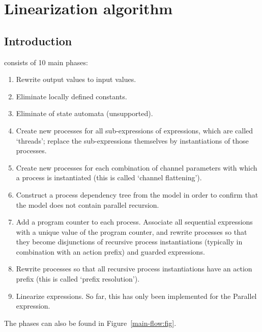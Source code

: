 \chapter{Linearization algorithm}

\section*{Introduction}

\lpeq{} consists of 10 main phases:
\begin{enumerate}[1.]
\item Rewrite output values to input values.
\item Eliminate locally defined constants.
\item Eliminate of state automata (unsupported).
\item Create new processes for all sub-expressions of \pedi{} expressions, which are called `threads'; replace the sub-expressions themselves by instantiations of those processes.
\item Create new processes for each combination of channel parameters with which a process is instantiated (this is called `channel flattening').
\item Construct a process dependency tree from the model in order to confirm that the model does not contain parallel recursion.
\item Add a program counter to each process.
Associate all sequential expressions with a unique value of the program counter, and rewrite processes so that they become disjunctions of recursive process instantiations (typically in combination with an action prefix) and guarded \pedi{} expressions.
\item Rewrite processes so that all recursive process instantiations have an action prefix (this is called `prefix resolution').
\item Linearize \pedi{} expressions.
So far, this has only been implemented for the Parallel expression.
\end{enumerate}

The phases can also be found in Figure~\ref{main-flow:fig}.

